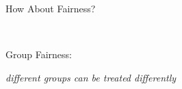 \documentclass[aspectratio=169,14pt]{beamer}
\begin{document}
\begin{frame}{How About Fairness?}
\begin{minipage}{0.5\linewidth}
  \end{minipage}%
  ~~~~~~
  \begin{minipage}{0.4\linewidth}
    Group Fairness:
    \begin{center}
      \textit{different groups can be treated differently}
    \end{center}
  \end{minipage}%

  \vspace{-2em}


  \vspace{1em}

\end{frame}
\end{document}

